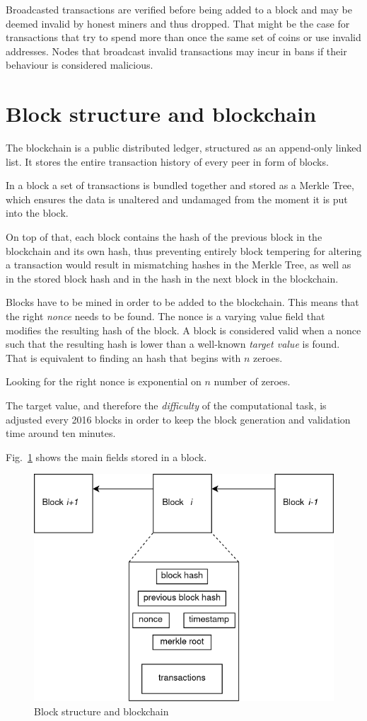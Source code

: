 Broadcasted transactions are verified before being added to a block and may be deemed invalid by honest miners and thus dropped. That might be the case for transactions that try to spend more than once the same set of coins or use invalid addresses. Nodes that broadcast invalid transactions may incur in bans if their behaviour is considered malicious.

\section{Block structure and blockchain}\label{sec:block}
The blockchain is a public distributed ledger, structured as an append-only linked list. It stores the entire transaction history of every peer in form of blocks.

In a block a set of transactions is bundled together and stored as a Merkle Tree, which ensures the data is unaltered and undamaged from the moment it is put into the block.

On top of that, each block contains the hash of the previous block in the blockchain and its own hash, thus preventing entirely block tempering for altering a transaction would result in mismatching hashes in the Merkle Tree, as well as in the stored block hash and in the hash in the next block in the blockchain.

Blocks have to be mined in order to be added to the blockchain. This means that the right \emph{nonce} needs to be found. The nonce is a varying value field that modifies the resulting hash of the block. A block is considered valid when a nonce such that the resulting hash is lower than a well-known \emph{target value} is found. That is equivalent to finding an hash that begins with $n$ zeroes.

Looking for the right nonce is exponential on $n$ number of zeroes.

The target value, and therefore the \emph{difficulty} of the computational task, is adjusted every 2016 blocks in order to keep the block generation and validation time around ten minutes.

Fig.~\ref{fig:blockstruct} shows the main fields stored in a block.

\begin{figure}[h]
	\includegraphics[width=.55\textwidth]{pict/blockstruct.png}
	\centering
	\caption{Block structure and blockchain}
	\label{fig:blockstruct}
\end{figure}

